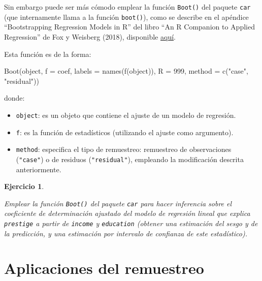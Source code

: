 \documentclass[
  10pt,
]{book}
\newenvironment{Shaded}{\begin{snugshade}}{\end{snugshade}}
\newcommand{\AttributeTok}[1]{\textcolor[rgb]{0.77,0.63,0.00}{#1}}
\newcommand{\DecValTok}[1]{\textcolor[rgb]{0.00,0.00,0.81}{#1}}
\newcommand{\FunctionTok}[1]{\textcolor[rgb]{0.00,0.00,0.00}{#1}}
\newcommand{\NormalTok}[1]{#1}
\newcommand{\StringTok}[1]{\textcolor[rgb]{0.31,0.60,0.02}{#1}}
\theoremstyle{break}
\newtheorem{exercise}{Ejercicio}[chapter]
\theoremstyle{nonumberplain}
\begin{document}
Sin embargo puede ser más cómodo emplear la función \texttt{Boot()} del paquete \texttt{car} (que internamente llama a la función \texttt{boot()}),
como se describe en el apéndice ``Bootstrapping Regression Models in R'' del libro ``An R Companion to Applied Regression'' de Fox y Weisberg (2018), disponible \href{https://socialsciences.mcmaster.ca/jfox/Books/Companion/appendices/Appendix-Bootstrapping.pdf}{aquí}.

Esta función es de la forma:

\begin{Shaded}
\begin{Highlighting}[]
\FunctionTok{Boot}\NormalTok{(object, }\AttributeTok{f =}\NormalTok{ coef, }\AttributeTok{labels =} \FunctionTok{names}\NormalTok{(}\FunctionTok{f}\NormalTok{(object)), }\AttributeTok{R =} \DecValTok{999}\NormalTok{, }
     \AttributeTok{method =} \FunctionTok{c}\NormalTok{(}\StringTok{"case"}\NormalTok{, }\StringTok{"residual"}\NormalTok{))}
\end{Highlighting}
\end{Shaded}

donde:

\begin{itemize}
\item
  \texttt{object}: es un objeto que contiene el ajuste de un modelo de regresión.
\item
  \texttt{f}: es la función de estadísticos (utilizando el ajuste como argumento).
\item
  \texttt{method}: especifica el tipo de remuestreo: remuestreo de observaciones (\texttt{"case"})
  o de residuos (\texttt{"residual"}), empleando la modificación descrita anteriormente.
\end{itemize}

\begin{exercise}
\protect\hypertarget{exr:boot-car}{}\label{exr:boot-car}

Emplear la función \texttt{Boot()} del paquete \texttt{car} para hacer inferencia sobre
el coeficiente de determinación ajustado del modelo de regresión lineal
que explica \texttt{prestige} a partir de \texttt{income} y \texttt{education}
(obtener una estimación del sesgo y de la predicción,
y una estimación por intervalo de confianza de este estadístico).
\end{exercise}

\hypertarget{boot-aplic}{%
\chapter{Aplicaciones del remuestreo}\label{boot-aplic}}
\end{document}
